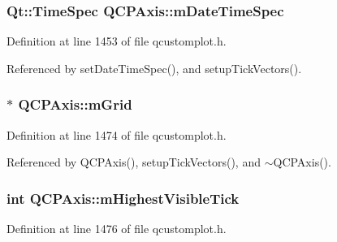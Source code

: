 \hypertarget{class_q_c_p_axis_af73bec228c1a3203dc8aef1e84a46759}{}
\subsubsection[{m\+Date\+Time\+Spec}]{\setlength{\rightskip}{0pt plus 5cm}Qt\+::\+Time\+Spec Q\+C\+P\+Axis\+::m\+Date\+Time\+Spec\hspace{0.3cm}{\ttfamily [protected]}}\label{class_q_c_p_axis_af73bec228c1a3203dc8aef1e84a46759}


Definition at line 1453 of file qcustomplot.\+h.



Referenced by set\+Date\+Time\+Spec(), and setup\+Tick\+Vectors().

\hypertarget{class_q_c_p_axis_a17bffb94aaa40311f259c6ac7bcb5d5f}{}
\subsubsection[{m\+Grid}]{$\ast$ Q\+C\+P\+Axis\+::m\+Grid\hspace{0.3cm}{\ttfamily [protected]}}\label{class_q_c_p_axis_a17bffb94aaa40311f259c6ac7bcb5d5f}


Definition at line 1474 of file qcustomplot.\+h.



Referenced by Q\+C\+P\+Axis(), setup\+Tick\+Vectors(), and $\sim$\+Q\+C\+P\+Axis().

\hypertarget{class_q_c_p_axis_abb3b3ccce7e9779fef2be91ce1a46ef0}{}
\subsubsection[{m\+Highest\+Visible\+Tick}]{\setlength{\rightskip}{0pt plus 5cm}int Q\+C\+P\+Axis\+::m\+Highest\+Visible\+Tick\hspace{0.3cm}{\ttfamily [protected]}}\label{class_q_c_p_axis_abb3b3ccce7e9779fef2be91ce1a46ef0}


Definition at line 1476 of file qcustomplot.\+h.



